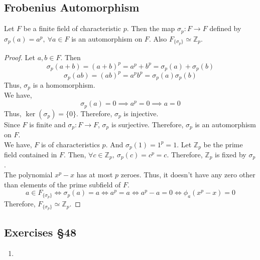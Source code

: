 \subsection{Frobenius Automorphism}
\begin{theorem}
	Let $F$ be a finite field of characteristic $p$.
	Then the map $\sigma_p : F \to F$ defined by $\sigma_p(a) = a^p,\ \forall a\in F$ is an automorphism on $F$.
	Also $F_{\{\sigma_p\}} \simeq \mathbb{Z}_p$.
\end{theorem}
\begin{proof} 
	Let $a,b \in F$.
	Then
	\[ \sigma_p(a+b) = (a+b)^p = a^p + b^p = \sigma_p(a) + \sigma_p(b)\]
	\[ \sigma_p(ab) = (ab)^p = a^p b^p = \sigma_p(a) \sigma_p(b) \]
	Thus, $\sigma_p$ is a homomorphism.\\

	We have,
	\[ \sigma_p(a) = 0 \implies a^p = 0 \implies a = 0 \]
	Thus, $\ker(\sigma_p) = \{ 0 \}$.
	Therefore, $\sigma_p$ is injective.\\

	Since $F$ is finite and $\sigma_p : F \to F$, $\sigma_p$ is surjective.
	Therefore, $\sigma_p$ is an automorphism on $F$.\\

	We have, $F$ is of characteristics $p$.
	And $\sigma_p(1) = 1^p = 1$.
	Let $\mathbb{Z}_p$ be the prime field contained in $F$.
	Then, $\forall c \in \mathbb{Z}_p,\ \sigma_p(c) = c^p = c$.
	Therefore, $\mathbb{Z}_p$ is fixed by $\sigma_p$.\\

	The polynomial $x^p-x$ has at most $p$ zeroes.
	Thus, it doesn't have any zero other than elements of the prime subfield of $F$.
	\[ a \in F_{\{\sigma_p\}} \iff \sigma_p(a) = a \iff a^p = a \iff a^p - a = 0  \iff \phi_a(x^p-x) = 0 \]
	Therefore, $F_{\{\sigma_p\}} \simeq \mathbb{Z}_p$.
\end{proof} 
\subsection{Exercises \S48}
\begin{enumerate}
	\item
\end{enumerate}

